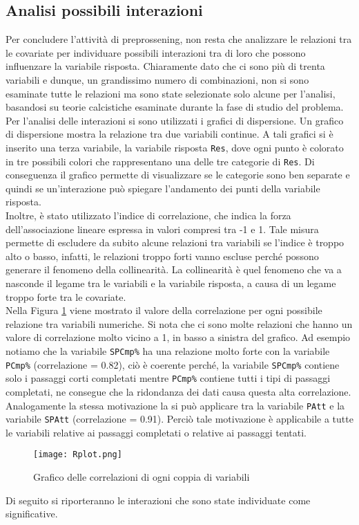 \subsection{Analisi possibili interazioni} 
Per concludere l'attività di preprossening, non resta che analizzare le relazioni tra le covariate per individuare possibili interazioni tra di loro che possono influenzare la variabile risposta. Chiaramente dato che ci sono più di trenta variabili e dunque, un grandissimo numero di combinazioni, non si sono esaminate tutte le relazioni ma sono state selezionate solo alcune per l'analisi, basandosi su teorie calcistiche esaminate durante la fase di studio del problema.\\
Per l'analisi delle interazioni si sono utilizzati i grafici di dispersione. Un grafico di dispersione mostra la relazione tra due variabili continue. A tali grafici si è inserito una terza variabile, la variabile risposta \texttt{Res}, dove ogni punto è colorato in tre possibili colori che rappresentano una delle tre categorie di \texttt{Res}. Di conseguenza il grafico permette di visualizzare se le categorie sono ben separate e quindi se un'interazione può spiegare l'andamento dei punti della variabile risposta.\\
Inoltre, è stato utilizzato l'indice di correlazione, che indica la forza dell'associazione lineare espressa in valori compresi tra -1 e 1. Tale misura permette di escludere da subito alcune relazioni tra variabili se l'indice è troppo alto o basso, infatti, le relazioni troppo forti vanno escluse perché possono generare il fenomeno della collinearità. La collinearità è quel fenomeno che va a nasconde il legame tra le variabili e la variabile risposta, a causa di un legame troppo forte tra le covariate.\\
Nella Figura \ref{fig:cor} viene mostrato il valore della correlazione per ogni possibile relazione tra variabili numeriche. Si nota che ci sono molte relazioni che hanno un valore di correlazione molto vicino a 1, in basso a sinistra del grafico. Ad esempio notiamo che la variabile \texttt{SPCmp\%} ha una relazione molto forte con la variabile \texttt{PCmp\%} (correlazione = 0.82), ciò è coerente perché, la variabile \texttt{SPCmp\%} contiene solo i passaggi corti completati mentre \texttt{PCmp\%} contiene tutti i tipi di passaggi completati, ne consegue che la ridondanza dei dati causa questa alta correlazione. Analogamente la stessa motivazione la si può applicare tra la variabile \texttt{PAtt} e la variabile \texttt{SPAtt} (correlazione = 0.91). Perciò tale motivazione è applicabile a tutte le variabili relative ai passaggi completati o relative ai passaggi tentati.
\begin{figure}[htbp]
	\begin{center}
		\texttt{[image: Rplot.png]}
		\caption{Grafico delle correlazioni di ogni coppia di variabili}  \label{fig:cor}
	\end{center}
\end{figure}
Di seguito si riporteranno le interazioni che sono state individuate come significative.\\ 

